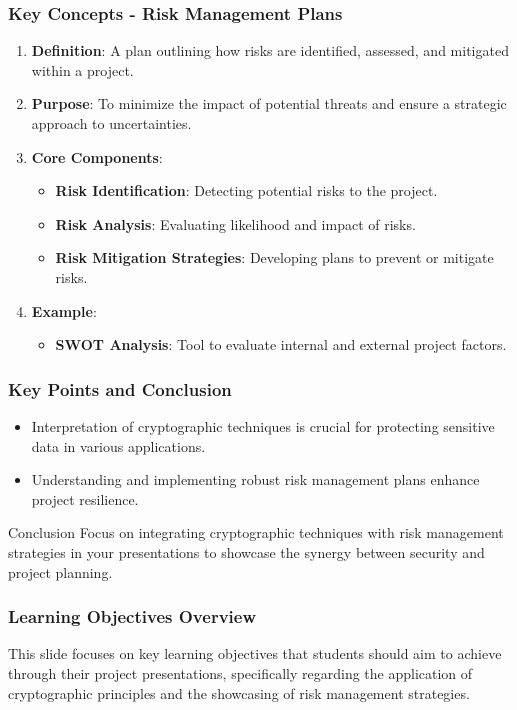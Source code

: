 \documentclass{beamer}
\begin{document}
\begin{frame}[fragile]
    \frametitle{Key Concepts - Risk Management Plans}
    \begin{enumerate}
        \item \textbf{Definition}: A plan outlining how risks are identified, assessed, and mitigated within a project.
        \item \textbf{Purpose}: To minimize the impact of potential threats and ensure a strategic approach to uncertainties.
        \item \textbf{Core Components}:
        \begin{itemize}
            \item \textbf{Risk Identification}: Detecting potential risks to the project.
            \item \textbf{Risk Analysis}: Evaluating likelihood and impact of risks.
            \item \textbf{Risk Mitigation Strategies}: Developing plans to prevent or mitigate risks.
        \end{itemize}
        \item \textbf{Example}:
        \begin{itemize}
            \item \textbf{SWOT Analysis}: Tool to evaluate internal and external project factors.
        \end{itemize}
    \end{enumerate}
\end{frame}

\begin{frame}[fragile]
    \frametitle{Key Points and Conclusion}
    \begin{itemize}
        \item Interpretation of cryptographic techniques is crucial for protecting sensitive data in various applications.
        \item Understanding and implementing robust risk management plans enhance project resilience.
    \end{itemize}
    \begin{block}{Conclusion}
        Focus on integrating cryptographic techniques with risk management strategies in your presentations to showcase the synergy between security and project planning.
    \end{block}
\end{frame}

\begin{frame}[fragile]
    \frametitle{Learning Objectives Overview}
    This slide focuses on key learning objectives that students should aim to achieve through their project presentations, specifically regarding the application of cryptographic principles and the showcasing of risk management strategies.
\end{frame}
\end{document}
